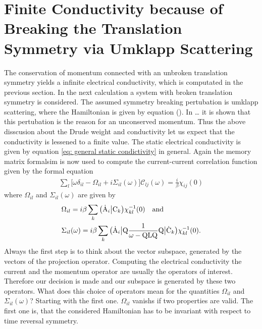 \section{Finite Conductivity because of Breaking the Translation Symmetry via Umklapp Scattering}
\label{sec: finite conductivity because of breaking the translation symmetry via umklapp scattering}
%
%
The conservation of momentum connected with an unbroken translation symmetry yields a infinite electrical conductivity, which is computated in the previous section.
In the next calculation a system with broken translation symmetry is considered.
The assumed symmetry breaking pertubation is umklapp scattering, where the Hamiltonian is given by equation ().
In \dots{} it is shown that this pertubation is the reason for an unconserved momentum.
Thus the above disscusion about the Drude weight and conductivity let us expect that the conductivity is lessened to a finite value.
The static electrical conductivity is given by equation \eqref{eq: general static condictivity} in general.
Again the memory matrix formalsim is now used to compute the current-current correlation function given by the formal equation
%
\begin{align}
	\sum\limits_{l} \Big[\omega \delta_{il} - \Omega_{il} + i \Sigma_{il}(\omega)\Big] \mathcal{C}_{lj}(\omega) = \frac{i}{\beta} \chi_{ij}(0)
\end{align}
%
where $\Omega_{il}$ and $\Sigma_{il}(\omega)$ are given by
%
\begin{align}
	&\Omega_{il} = i \beta \sum\limits_{k} \obraket{\dot{\mt{A}}_{i}}{\mt{C}_{k}} \chi_{kl}^{-1}(0) \qq{and} \\
	&\Sigma_{il}(\omega) = i \beta \sum\limits_{k} \obra{\dot{\mt{A}}_{i}} \mt{Q} \frac{1}{\omega - \mt{QLQ}} \mt{Q} \oket{\dot{\mt{C}}_{k}} \chi_{kl}^{-1}(0).
\end{align}
%
Always the first step is to think about the vector subspace, generated by the vectors of the projection operator.
Computing the electrical conductivity the current and the momentum operator are usually the operators of interest. 
Therefore our decision is made and our subspace is generated by these two operators.
What does this choice of operators mean for the quantities $\Omega_{il}$ and $\Sigma_{il}(\omega)$?
Starting with the first one.
$\Omega_{il}$ vanishs if two properties are valid.
The first one is, that the considered Hamiltonian has to be invariant with respect to time reversal symmetry.
